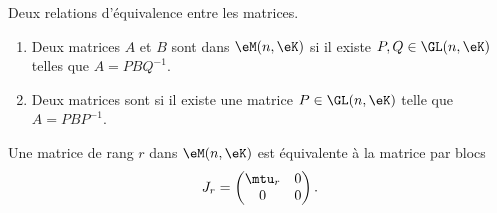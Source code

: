 \begin{definition}  \label{DefBLELooTvlHoB}
    Deux relations d'équivalence entre les matrices.
    \begin{enumerate}
        \item   \label{ItemPFXCooOUbSCt}
    Deux matrices \( A\) et \( B\) sont  dans \( \eM(n,\eK)\) si il existe \( P,Q\in\GL(n,\eK)\) telles que \( A=PBQ^{-1}\). 
\item
    Deux matrices sont  si il existe une matrice \( P\in \GL(n,\eK)\) telle que \( A=PBP^{-1}\).
    \end{enumerate}
\end{definition}

\begin{lemma}   \label{LemZMxxnfM}
    Une matrice de rang \( r\) dans \( \eM(n,\eK)\) est équivalente à la matrice par blocs
    \begin{equation}
        J_r=\begin{pmatrix}
            \mtu_r    &   0    \\ 
            0    &   0    
        \end{pmatrix}.
    \end{equation}
\end{lemma}

